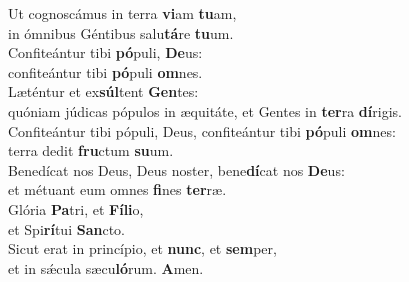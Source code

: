 \evenverse Ut cognoscámus in terra \textbf{vi}am \textbf{tu}am,~\*\\
\evenverse in ómnibus Géntibus salu\textbf{tá}re \textbf{tu}um.\\
\oddverse Confiteántur tibi \textbf{pó}puli, \textbf{De}us:~\*\\
\oddverse confiteántur tibi \textbf{pó}puli \textbf{om}nes.\\
\evenverse Læténtur et ex\textbf{súl}tent \textbf{Gen}tes:~\*\\
\evenverse quóniam júdicas pópulos in æquitáte, et Gentes in \textbf{ter}ra \textbf{dí}rigis.\\
\oddverse Confiteántur tibi pópuli, Deus, confiteántur tibi \textbf{pó}puli \textbf{om}nes:~\*\\
\oddverse terra dedit \textbf{fru}ctum \textbf{su}um.\\
\evenverse Benedícat nos Deus, Deus noster, bene\textbf{dí}cat nos \textbf{De}us:~\*\\
\evenverse et métuant eum omnes \textbf{fi}nes \textbf{ter}ræ.\\
\oddverse Glória \textbf{Pa}tri, et \textbf{Fí}\textbf{li}o,~\*\\
\oddverse et Spi\textbf{rí}tui \textbf{San}cto.\\
\evenverse Sicut erat in princípio, et \textbf{nunc}, et \textbf{sem}per,~\*\\
\evenverse et in sǽcula sæcu\textbf{ló}rum. \textbf{A}men.\\
